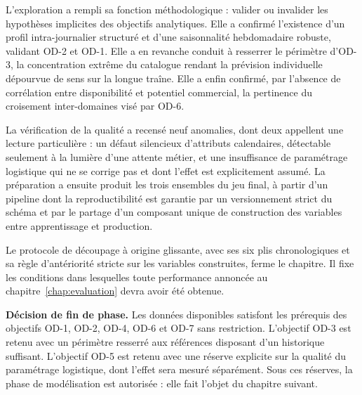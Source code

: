 L'exploration a rempli sa fonction méthodologique : valider ou invalider les hypothèses implicites des objectifs analytiques. Elle a confirmé l'existence d'un profil intra-journalier structuré et d'une saisonnalité hebdomadaire robuste, validant OD-2 et OD-1. Elle a en revanche conduit à resserrer le périmètre d'OD-3, la concentration extrême du catalogue rendant la prévision individuelle dépourvue de sens sur la longue traîne. Elle a enfin confirmé, par l'absence de corrélation entre disponibilité et potentiel commercial, la pertinence du croisement inter-domaines visé par OD-6.

La vérification de la qualité a recensé neuf anomalies, dont deux appellent une lecture particulière : un défaut silencieux d'attributs calendaires, détectable seulement à la lumière d'une attente métier, et une insuffisance de paramétrage logistique qui ne se corrige pas et dont l'effet est explicitement assumé. La préparation a ensuite produit les trois ensembles du jeu final, à partir d'un pipeline dont la reproductibilité est garantie par un versionnement strict du schéma et par le partage d'un composant unique de construction des variables entre apprentissage et production.

Le protocole de découpage à origine glissante, avec ses six plis chronologiques et sa règle d'antériorité stricte sur les variables construites, ferme le chapitre. Il fixe les conditions dans lesquelles toute performance annoncée au chapitre~\ref{chap:evaluation} devra avoir été obtenue.

\textbf{Décision de fin de phase.} Les données disponibles satisfont les prérequis des objectifs OD-1, OD-2, OD-4, OD-6 et OD-7 sans restriction. L'objectif OD-3 est retenu avec un périmètre resserré aux références disposant d'un historique suffisant. L'objectif OD-5 est retenu avec une réserve explicite sur la qualité du paramétrage logistique, dont l'effet sera mesuré séparément. Sous ces réserves, la phase de modélisation est autorisée : elle fait l'objet du chapitre suivant.
